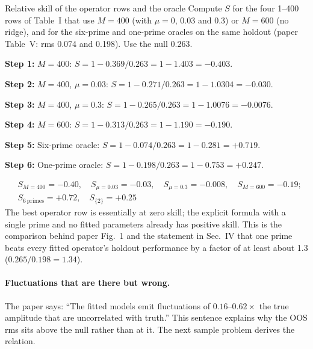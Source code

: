 \begin{sample}{Relative skill of the operator rows and the oracle}
Compute $S$ for the four 1--400 rows of Table~I that use $M=400$ (with $\mu=0$, $0.03$ and $0.3$) or $M=600$ (no ridge), and for the six-prime and one-prime oracles on the same holdout (paper Table~V: rms 0.074 and 0.198). Use the null 0.263.

\textbf{Step 1:} $M=400$: $S=1-0.369/0.263=1-1.403=-0.403$.

\textbf{Step 2:} $M=400$, $\mu=0.03$: $S=1-0.271/0.263=1-1.0304=-0.030$.

\textbf{Step 3:} $M=400$, $\mu=0.3$: $S=1-0.265/0.263=1-1.0076=-0.0076$.

\textbf{Step 4:} $M=600$: $S=1-0.313/0.263=1-1.190=-0.190$.

\textbf{Step 5:} Six-prime oracle: $S=1-0.074/0.263=1-0.281=+0.719$.

\textbf{Step 6:} One-prime oracle: $S=1-0.198/0.263=1-0.753=+0.247$.

\[
\boxed{\begin{aligned}&S_{M=400}=-0.40,\quad S_{\mu=0.03}=-0.03,\quad S_{\mu=0.3}=-0.008,\quad S_{M=600}=-0.19;\\ &S_{6\,\text{primes}}=+0.72,\quad S_{\{2\}}=+0.25\end{aligned}}
\]
The best operator row is essentially at zero skill; the explicit formula with a single prime and no fitted parameters already has positive skill. This is the comparison behind paper Fig.~1 and the statement in Sec.~IV that one prime beats every fitted operator's holdout performance by a factor of at least about 1.3 ($0.265/0.198=1.34$).
\end{sample}

\paragraph{Fluctuations that are there but wrong.} The paper says: ``The fitted models emit fluctuations of $0.16$--$0.62\times$ the true amplitude that are uncorrelated with truth.'' This sentence explains why the OOS rms sits above the null rather than at it. The next sample problem derives the relation.

